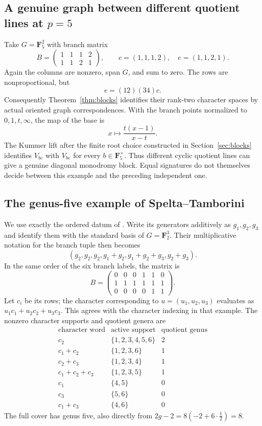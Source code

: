\documentclass[11pt]{article}
\theoremstyle{definition}
\newcommand{\F}{\mathbf F}
\begin{document}
\subsection{A genuine graph between different quotient lines at $p=5$}
Take $G=\F_5^2$ with branch matrix
\[
 B=\begin{pmatrix}1&1&1&2\\1&1&2&1\end{pmatrix},
 \qquad c=(1,1,1,2),\quad e=(1,1,2,1).
\]
Again the columns are nonzero, span $G$, and sum to zero. The rows are
nonproportional, but
\[
                         e=(12)(34)c.
\]
Consequently Theorem~\ref{thm:blocks} identifies their rank-two
character spaces by actual oriented graph correspondences. With the
branch points normalized to $0,1,t,\infty$, the map of the base is
\[
                         x\longmapsto\frac{t(x-1)}{x-t}.
\]
The Kummer lift after the finite root choice constructed in
Section~\ref{sec:blocks} identifies $V_{bc}$ with $V_{be}$ for every
$b\in\F_5^\times$. Thus different cyclic quotient lines can give a
genuine diagonal monodromy block. Equal signatures do not themselves
decide between this example and the preceding independent one.

\subsection{The genus-five example of Spelta--Tamborini}
We use exactly the ordered datum of \cite[Section~3, Example~2]{ST}.
Write its generators additively as $g_1,g_2,g_3$ and identify them with
the standard basis of $G=\F_2^3$. Their multiplicative notation for the
branch tuple then becomes
\[
 (g_2,g_2,g_2,g_1+g_2,g_1+g_2+g_3,g_2+g_3).
\]
In the same order of the six branch labels, the matrix is
\[
 B=\begin{pmatrix}
 0&0&0&1&1&0\\
 1&1&1&1&1&1\\
 0&0&0&0&1&1
 \end{pmatrix}.
\]
Let $c_i$ be its rows; the character corresponding to
$u=(u_1,u_2,u_3)$ evaluates as $u_1c_1+u_2c_2+u_3c_3$.
This agrees with the character indexing in that example. The nonzero
character supports and quotient genera are
\[
\begin{array}{c|c|c}
 \text{character word}&\text{active support}&\text{quotient genus}\\ \hline
 c_2&\{1,2,3,4,5,6\}&2\\
 c_1+c_2&\{1,2,3,6\}&1\\
 c_2+c_3&\{1,2,3,4\}&1\\
 c_1+c_2+c_3&\{1,2,3,5\}&1\\
 c_1&\{4,5\}&0\\
 c_3&\{5,6\}&0\\
 c_1+c_3&\{4,6\}&0
\end{array}
\]
The full cover has genus five, also directly from
$2g-2=8(-2+6\cdot\frac12)=8$.
\end{document}

